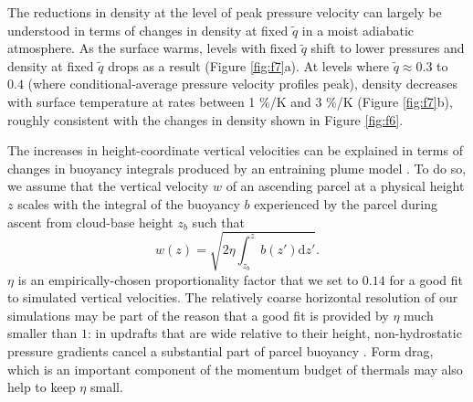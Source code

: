 \documentclass[twocol]{ametsoc}
\begin{document}
The reductions in density at the level of peak pressure velocity can largely be understood in terms of changes in density at fixed $\tilde{q}$ in a moist adiabatic atmosphere. As the surface warms, levels with fixed $\tilde{q}$ shift to lower pressures and density at fixed $\tilde{q}$ drops as a result (Figure \ref{fig:f7}a). At levels where $\tilde{q} \approx 0.3$ to $0.4$ (where conditional-average pressure velocity profiles peak), density decreases with surface temperature at rates between 1 \%/K and 3 \%/K (Figure \ref{fig:f7}b), roughly consistent with the changes in density shown in Figure \ref{fig:f6}.

The increases in height-coordinate vertical velocities can be explained in terms of changes in buoyancy integrals produced by an entraining plume model \citep[based on][]{Singh2015IncreasesEquilibrium}. To do so, we assume that the vertical velocity $w$ of an ascending parcel at a physical height $z$ scales with the integral of the buoyancy $b$ experienced by the parcel during ascent from cloud-base height $z_b$ such that \citep[e.g.][]{Holton2013AnMeteorology}
\begin{equation}
    w(z) = \sqrt{2 \eta \int_{z_b}^{z} b(z') \mathrm{d} z'}.
\end{equation}
$\eta$ is an empirically-chosen proportionality factor that we set to $0.14$ for a good fit to simulated vertical velocities. The relatively coarse horizontal resolution of our simulations may be part of the reason that a good fit is provided by $\eta$ much smaller than $1$: in updrafts that are wide relative to their height, non-hydrostatic pressure gradients cancel a substantial part of parcel buoyancy \citep{Jeevanjee2016EffectiveAloft}. Form drag, which is an important component of the momentum budget of thermals \citep{Romps2015StereoThermals,Jeevanjee2015EffectivePools,Morrison2018TheoreticalThermals} may also help to keep $\eta$ small.
\end{document}
